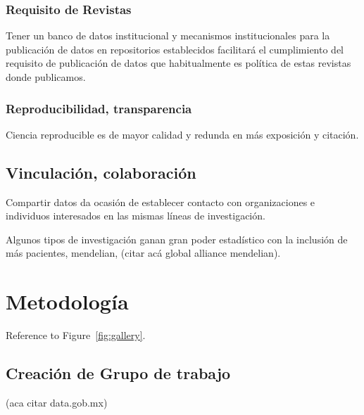 \documentclass[
10pt, %
letterpaper, %
oneside, %
headinclude,footinclude, %
BCOR5mm, %
]{scrartcl}
\begin{document}
\subsubsection{Requisito de Revistas}
Tener un banco de datos institucional y mecanismos institucionales
para la publicación de datos en repositorios establecidos facilitará
el cumplimiento del requisito de publicación de datos que
habitualmente es política \cite{hrynaszkiewicz} de estas revistas
donde publicamos.


\subsubsection{Reproducibilidad, transparencia}
Ciencia reproducible es de mayor calidad y redunda en más exposición y
citación. \cite{piwowar_sharing_2007} \cite{ioannidis}

\subsection{Vinculación, colaboración}
Compartir datos da ocasión de establecer contacto con organizaciones e
individuos interesados en las mismas líneas de investigación.

Algunos tipos de investigación ganan gran poder estadístico con la
inclusión de más pacientes, mendelian, (citar acá global alliance
mendelian). 


\section{Metodología}
Reference to Figure~\vref{fig:gallery}. %



\subsection{Creación de Grupo de trabajo}
(aca citar data.gob.mx)
\end{document}
